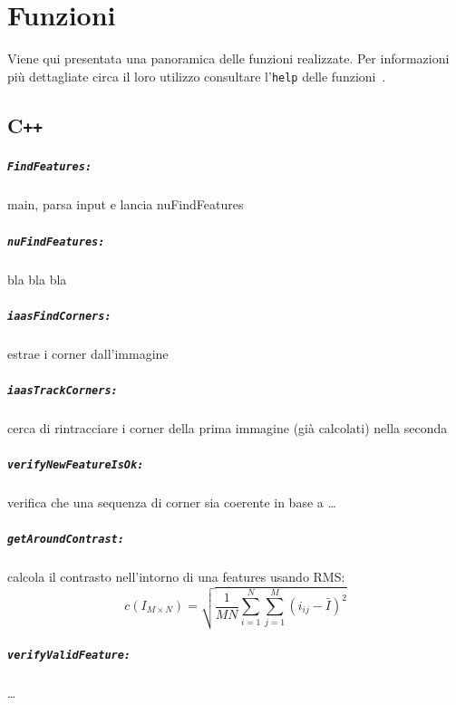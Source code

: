 \documentclass[12pt]{report}
\begin{document}
\chapter{Funzioni}

Viene qui presentata una panoramica delle funzioni realizzate. Per informazioni pi\`u dettagliate circa il loro utilizzo consultare l'\verb|help| delle funzioni~\cite{lucaskanade81}.

\section[C++]{C\verb_++_}

\paragraph*{\verb_FindFeatures:_} main, parsa input e lancia nuFindFeatures

\paragraph*{\verb_nuFindFeatures:_} bla bla bla

\paragraph*{\verb_iaasFindCorners:_} estrae i corner dall'immagine

\paragraph*{\verb_iaasTrackCorners:_} cerca di rintracciare i corner della prima immagine (gi\`a calcolati) nella seconda

\paragraph*{\verb_verifyNewFeatureIsOk:_} verifica che una sequenza di corner sia coerente in base a \dots

\paragraph*{\verb_getAroundContrast:_} calcola il contrasto nell'intorno di una features usando RMS: $$ c\left(I_{M\times N}\right) = \sqrt{\frac{1}{MN}\sum_{i=1}^N\sum_{j=1}^M(i_{ij}-\bar{I})^2} $$

\paragraph*{\verb_verifyValidFeature:_} \dots
\end{document}
